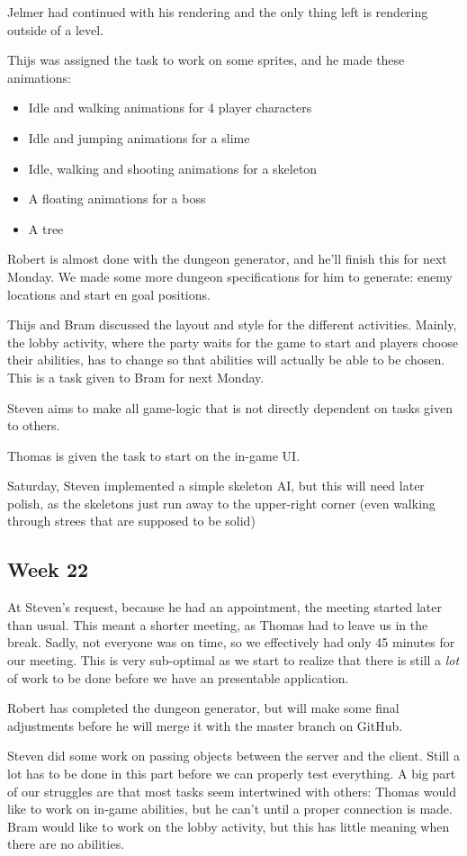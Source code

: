 \documentclass[../main.tex]{subfiles}
\begin{document}
Jelmer had continued with his rendering and the only thing left is rendering outside of a level. 

Thijs was assigned the task to work on some sprites, and he made these animations:
\begin{itemize}
	\item Idle and walking animations for 4 player characters
	\item Idle and jumping animations for a slime
	\item Idle, walking and shooting animations for a skeleton
	\item A floating animations for a boss
	\item A tree
\end{itemize}
Robert is almost done with the dungeon generator, and he'll finish this for next Monday. We made some more dungeon specifications for him to generate: enemy locations and start en goal positions.

Thijs and Bram discussed the layout and style for the different activities. Mainly, the lobby activity, where the party waits for the game to start and players choose their abilities, has to change so that abilities will actually be able to be chosen. This is a task given to Bram for next Monday. 

Steven aims to make all game-logic that is not directly dependent on tasks given to others. 

Thomas is given the task to start on the in-game UI. 

Saturday, Steven implemented a simple skeleton AI, but this will need later polish, as the skeletons just run away to the upper-right corner (even walking through strees that are supposed to be solid)


\subsection*{Week 22}
At Steven's request, because he had an appointment, the meeting started later than usual. This meant a shorter meeting, as Thomas had to leave us in the break. Sadly, not everyone was on time, so we effectively had only 45 minutes for our meeting. This is very sub-optimal as we start to realize that there is still a \textit{lot} of work to be done before we have an presentable application.

Robert has completed the dungeon generator, but will make some final adjustments before he will merge it with the master branch on GitHub. 

Steven did some work on passing objects between the server and the client. Still a lot has to be done in this part before we can properly test everything. A big part of our struggles are that most tasks seem intertwined with others: Thomas would like to work on in-game abilities, but he can't until a proper connection is made. Bram would like to work on the lobby activity, but this has little meaning when there are no abilities.
\end{document}
